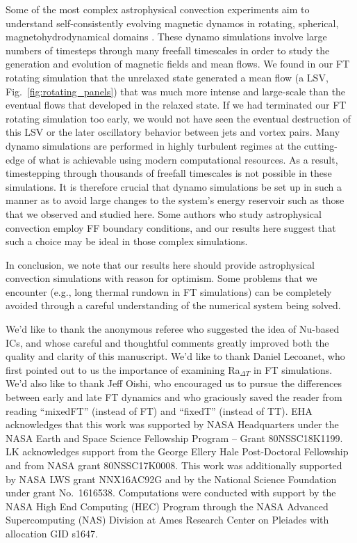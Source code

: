 \documentclass[aps, pre, onecolumn, nofootinbib, notitlepage, groupedaddress, amsfonts, amssymb, amsmath, longbibliography, superscriptaddress]{revtex4-1}
\newcommand{\ea}[1]{{\color{red} #1}}
\begin{document}
Some of the most complex astrophysical convection experiments aim to understand self-consistently evolving magnetic dynamos in rotating, spherical, magnetohydrodynamical domains \cite{brown&all2010, yadav&all2016, strugarek&all2017, strugarek&all2018}.
These dynamo simulations involve large numbers of timesteps through many freefall timescales in order to study the generation and evolution of magnetic fields and mean flows.
We found in our FT rotating simulation that the unrelaxed state generated a mean flow (a LSV, Fig.~\ref{fig:rotating_panels}) that was much more intense and large-scale than the eventual flows that developed in the relaxed state.
If we had terminated our FT rotating simulation too early, we would not have seen the eventual destruction of this LSV or the later oscillatory behavior between jets and vortex pairs.
Many dynamo simulations are performed in highly turbulent regimes at the cutting-edge of what is achievable using modern computational resources.
As a result, timestepping through thousands of freefall timescales is not possible in these simulations.
It is therefore crucial that dynamo simulations be set up in such a manner as to avoid large changes to the system's energy reservoir such as those that we observed and studied here.
Some authors who study astrophysical convection \citep{featherstone&hindman2016a, strugarek&all2018, bordwell&all2018, matilsky&all2019} employ FF boundary conditions, and our results here suggest that such a choice may be ideal in those complex simulations.

In conclusion, we note that our results here should provide astrophysical convection simulations with reason for optimism.
Some problems that we encounter (e.g., long thermal rundown in FT simulations) can be completely avoided through a careful understanding of the numerical system being solved.

\begin{acknowledgments}
\ea{We'd like to thank the anonymous referee who suggested the idea of Nu-based ICs, and whose careful and thoughtful comments greatly improved both the quality and clarity of this manuscript.}
We'd like to thank Daniel Lecoanet, who first pointed out to us the importance of examining Ra$_{\Delta T}$ in FT simulations. 
We'd also like to thank Jeff Oishi, who encouraged us to pursue the differences between early and late FT dynamics and who graciously saved the reader from reading ``mixedFT'' (instead of FT) and ``fixedT'' (instead of TT).
EHA acknowledges that this work was supported by NASA Headquarters under the NASA Earth and Space Science Fellowship Program -- Grant 80NSSC18K1199.
LK acknowledges support from the George Ellery Hale Post-Doctoral Fellowship and from NASA grant 80NSSC17K0008.
This work was additionally supported by NASA LWS grant NNX16AC92G and by the National Science Foundation under grant No.~1616538. 
Computations were conducted with support by the NASA High End Computing (HEC) Program through the NASA  Advanced Supercomputing (NAS) Division at Ames Research Center on Pleiades with allocation GID s1647.
\end{acknowledgments}
\end{document}
